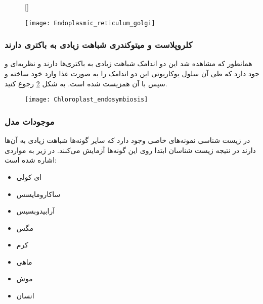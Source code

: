 \begin{description}
\begin{figure}[htbp]
	\centering
	\qquad
\end{figure} 
 
\begin{figure}[t]
	[\FBwidth]
{\caption
{
}
\label{fig:EndoplasmicReticulum}}
{\texttt{[image: Endoplasmic\_reticulum\_golgi]}}

\end{figure}  
 
\end{description}

\pagebreak
\subsubsection{کلروپلاست و میتوکندری شباهت زیادی به باکتری دارند}

همانطور که مشاهده شد این دو اندامک شباهت زیادی به باکتری‌ها دارند و نظریه‌ای و جود دارد که طی آن سلول یوکاریوتی این دو اندامک را به صورت غذا وارد خود ساخته و سپس با آن همزیست شده است. به شکل
\ref{figure:PrimaryEndosymbiosis}
رجوع کنید.

\begin{figure}[hbt]
	\centering
	\texttt{[image: Chloroplast\_endosymbiosis]}
	\caption{}
	\label{figure:PrimaryEndosymbiosis}
\end{figure}

\subsubsection{موجودات مدل}
در زیست شناسی نمونه‌های خاصی وجود دارد که سایر گونه‌ها شباهت زیادی به آن‌ها دارند در نتیجه زیست شناسان ابتدا روی این گونه‌ها آزمایش می‌کنند. در زیر به مواردی اشاره شده است:

\begin{itemize}
\item ای کولی
\item ساکارومایسس
\item آرابیدوبسیس
\item مگس
\item کرم
\item ماهی
\item موش
\item انسان
\end{itemize}


